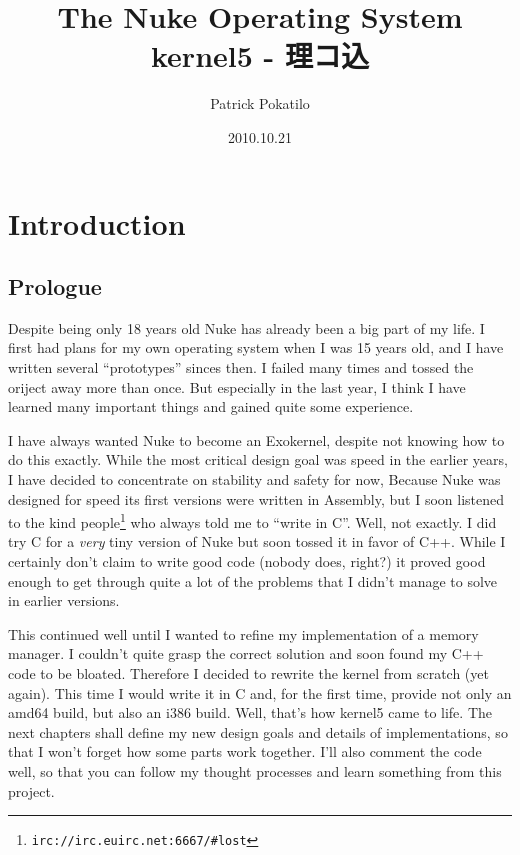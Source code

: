 \documentclass[a4paper,openany]{scrbook}
\title{The Nuke Operating System\\kernel5 - 理コ込}
\author{Patrick Pokatilo}
\date{2010.10.21}
\begin{document}
\normalem

\pagestyle{fancy}
\setlength{\oddsidemargin}{0mm}
\setlength{\evensidemargin}{0mm}
\setlength{\textwidth}{159.2mm}
\setlength{\parskip}{\medskipamount}
\setlength{\parindent}{0mm}

\begin{titlepage}
\maketitle
\end{titlepage}

\tableofcontents

\part{Introduction}
\chapter{Prologue}
Despite being only 18 years old Nuke has already been a big part of
my life. I first had plans for my own operating system when I was
15 years old, and I have written several ``prototypes'' sinces then.
I failed many times and tossed the oriject away more than once. But
especially in the last year, I think I have learned many important
things and gained quite some experience.

I have always wanted Nuke to become an Exokernel, despite not knowing
how to do this exactly. While the most critical design goal was speed
in the earlier years, I have decided to concentrate on stability and
safety for now, Because Nuke was designed for speed its first versions
were written in Assembly, but I soon listened to
the kind people\footnote{\tt{irc://irc.euirc.net:6667/\#lost}}
who always told me to ``write in C''. Well, not exactly. I did try
C for a \textsl{very} tiny version of Nuke but soon tossed it in favor
of C++. While I certainly don't claim to write good code (nobody does,
right?) it proved good enough to get through quite a lot of the problems
that I didn't manage to solve in earlier versions.

This continued well until I wanted to refine my implementation of
a memory manager. I couldn't quite grasp the correct solution and
soon found my C++ code to be bloated. Therefore I decided to rewrite
the kernel from scratch (yet again). This time I would write it in C and, for
the first time, provide not only an amd64 build, but also an i386 build.
Well, that's how kernel5 came to life. The next chapters shall define
my new design goals and details of implementations, so that I won't
forget how some parts work together. I'll also comment the code well,
so that you can follow my thought processes and learn something from
this project.
\end{document}
